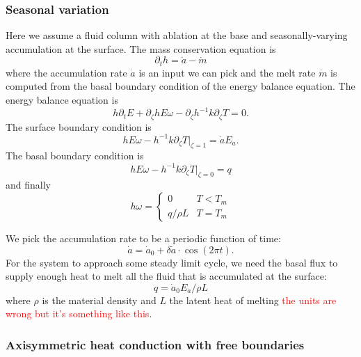 \documentclass{article}
\theoremstyle{definition}
\theoremstyle{plain}
\begin{document}
\subsubsection{Seasonal variation}
Here we assume a fluid column with ablation at the base and seasonally-varying accumulation at the surface.
The mass conservation equation is
\begin{equation}
    \partial_th = \dot a - \dot m
\end{equation}
where the accumulation rate $\dot a$ is an input we can pick and the melt rate $\dot m$ is computed from the basal boundary condition of the energy balance equation.
The energy balance equation is
\begin{equation}
    h\partial_t E + \partial_\zeta hE\omega - \partial_\zeta h^{-1}k\partial_\zeta T = 0.
\end{equation}
The surface boundary condition is
\begin{equation}
    hE\omega - h^{-1}k\partial_\zeta T\Big|_{\zeta = 1} = \dot aE_{\dot a}.
\end{equation}
The basal boundary condition is
\begin{equation}
    hE\omega - h^{-1}k\partial_\zeta T\Big|_{\zeta = 0} = q
\end{equation}
and finally
\begin{equation}
    h\omega = \begin{cases}0 & T < T_m \\ q/\rho L & T = T_m\end{cases}
\end{equation}

We pick the accumulation rate to be a periodic function of time:
\begin{equation}
    \dot a = \dot a_0 + \delta\dot a\cdot\cos(2\pi t).
\end{equation}
For the system to approach some steady limit cycle, we need the basal flux to supply enough heat to melt all the fluid that is accumulated at the surface:
\begin{equation}
    q = \dot a_0 E_{\dot a} / \rho L
\end{equation}
where $\rho$ is the material density and $L$ the latent heat of melting \textcolor{red}{the units are wrong but it's something like this}.

\subsubsection{Axisymmetric heat conduction with free boundaries}
\end{document}
